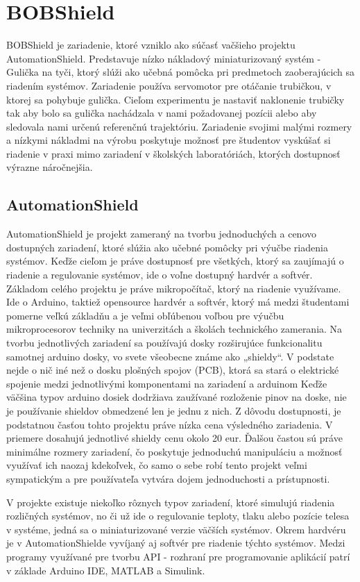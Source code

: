 \chapter{BOBShield}
\label{kap:1}
BOBShield je zariadenie, ktoré vzniklo ako súčasť vačšieho projektu AutomationShield. Predstavuje  nízko nákladový miniaturizovaný systém - Gulička na tyči, ktorý slúži ako učebná pomôcka pri predmetoch zaoberajúcich sa riadením systémov. Zariadenie používa servomotor pre otáčanie trubičkou, v ktorej sa pohybuje gulička. Cieľom experimentu je nastaviť naklonenie trubičky tak aby bolo sa gulička nachádzala v nami požadovanej pozícii alebo aby sledovala nami určenú referenčnú trajektóriu. Zariadenie svojimi malými rozmery a nízkymi nákladmi na výrobu poskytuje možnosť pre študentov vyskúšať si riadenie v praxi mimo zariadení v školských laboratóriách, ktorých dostupnosť výrazne náročnejšia.     
\section{AutomationShield}
\label{kap1.1}
AutomationShield je projekt zameraný na tvorbu jednoduchých a cenovo dostupných zariadení, ktoré slúžia ako učebné pomôcky pri výučbe riadenia systémov. Keďže cieľom je práve dostupnosť pre všetkých, ktorý sa zaujímajú o riadenie a regulovanie systémov, ide o voľne dostupný hardvér a softvér. Základom celého projektu je práve mikropočítač, ktorý na riadenie využívame. Ide o Arduino, taktiež opensource hardvér a softvér, ktorý má medzi študentami pomerne veľkú základňu a je veľmi obľúbenou voľbou pre výučbu mikroprocesorov techniky na  univerzitách a školách technického zamerania. Na tvorbu jednotlivých zariadení sa používajú dosky rozširujúce funkcionalitu samotnej arduino dosky, vo svete všeobecne známe ako „shieldy“. V podstate nejde o nič iné než o dosku plošných spojov (PCB), ktorá sa stará o elektrické spojenie medzi jednotlivými komponentami na zariadení a arduinom Keďže väčšina typov arduino dosiek dodržiava zaužívané rozloženie pinov na doske, nie je používanie shieldov obmedzené len je jednu z nich. Z dôvodu dostupnosti, je podstatnou časťou tohto projektu práve nízka cena výsledného zariadenia. V priemere dosahujú jednotlivé shieldy cenu okolo 20 eur. Ďalšou častou sú práve minimálne rozmery zariadení, čo poskytuje jednoduchú manipuláciu a možnosť využívať ich naozaj kdekoľvek, čo samo o sebe robí tento projekt veľmi sympatickým a pre používateľa vytvára dojem jednoduchosti a prístupnosti.
 
V projekte existuje niekoľko rôznych typov zariadení, ktoré simulujú riadenia rozličných systémov, no či už ide o regulovanie teploty, tlaku alebo pozície telesa v systéme, jedná sa o miniaturizované verzie väčších systémov. Okrem hardvéru je v AutomationShielde vyvíjaný aj softvér pre riadenie týchto systémov. Medzi programy využívané pre tvorbu API - rozhraní pre programovanie aplikácií patrí v základe Arduino IDE, MATLAB a Simulink.  


